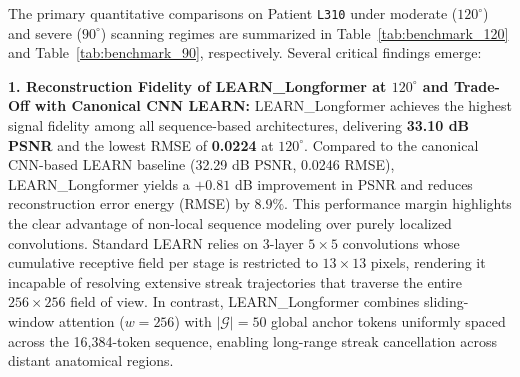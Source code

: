 \documentclass[runningheads]{llncs}
\begin{document}
\begin{table}[t]
\centering
\caption{Quantitative reconstruction benchmark under severe limited-angle geometry ($90^\circ$, 64 views, missing $180^\circ$ Fourier angular wedge, $50\%$ frequency null space under Hermitian symmetry) on the Mayo Clinic LDCT test set (Patient \texttt{L310}, 214 slices). Best baseline results are in \textbf{bold}, second-best are \underline{underlined}.}
\label{tab:benchmark_90}
\end{table}

The primary quantitative comparisons on Patient \texttt{L310} under moderate ($120^\circ$) and severe ($90^\circ$) scanning regimes are summarized in Table~\ref{tab:benchmark_120} and Table~\ref{tab:benchmark_90}, respectively. Several critical findings emerge:

\noindent \textbf{1. Reconstruction Fidelity of LEARN\_Longformer at $120^\circ$ and Trade-Off with Canonical CNN LEARN:} 
LEARN\_Longformer achieves the highest signal fidelity among all sequence-based architectures, delivering \textbf{33.10 dB PSNR} and the lowest RMSE of \textbf{0.0224} at $120^\circ$. Compared to the canonical CNN-based LEARN baseline (32.29 dB PSNR, 0.0246 RMSE), LEARN\_Longformer yields a $+0.81$ dB improvement in PSNR and reduces reconstruction error energy (RMSE) by $8.9\%$. This performance margin highlights the clear advantage of non-local sequence modeling over purely localized convolutions. Standard LEARN relies on 3-layer $5 \times 5$ convolutions whose cumulative receptive field per stage is restricted to $13 \times 13$ pixels, rendering it incapable of resolving extensive streak trajectories that traverse the entire $256 \times 256$ field of view. In contrast, LEARN\_Longformer combines sliding-window attention ($w = 256$) with $|\mathcal{G}| = 50$ global anchor tokens uniformly spaced across the 16,384-token sequence, enabling long-range streak cancellation across distant anatomical regions. 
\end{document}
